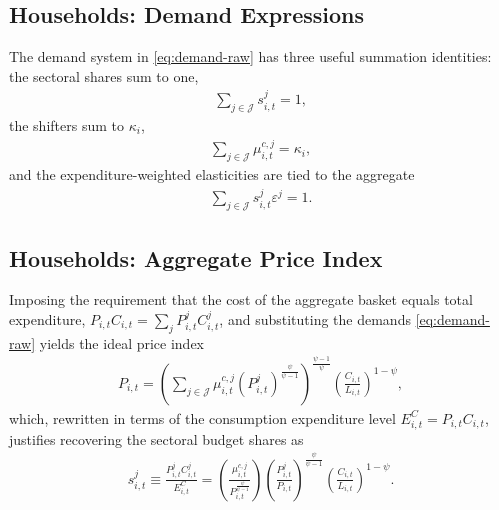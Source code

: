 \documentclass[10pt]{article}
\begin{document}
\subsection*{Households: Demand Expressions}
The demand system in \eqref{eq:demand-raw} has three useful summation identities:
the sectoral shares sum to one,
\begin{align}
  \sum_{j \in \mathcal{J}} s^j_{i,t} = 1, \label{eq:sum1}
\end{align}
the shifters sum to $\kappa_i$,
\begin{align}
  \sum_{j \in \mathcal{J}} \mu^{c,j}_{i,t} = \kappa_i, \label{eq:sum2}
\end{align}
and the expenditure-weighted elasticities are tied to the aggregate
\begin{align}
  \sum_{j \in \mathcal{J}} s^j_{i,t} \varepsilon^j = 1. \label{eq:sum3}
\end{align}

\subsection*{Households: Aggregate Price Index}
Imposing the requirement that the cost of the aggregate basket equals total
expenditure, $P_{i,t} C_{i,t} = \sum_{j} P^j_{i,t} C^j_{i,t}$, and substituting the
demands \eqref{eq:demand-raw} yields the ideal price index
\begin{align}
  P_{i,t} = \left( \sum_{j \in \mathcal{J}} \mu^{c,j}_{i,t}
  \left( P^j_{i,t} \right)^{\frac{\psi}{\psi - 1}} \right)^{\frac{\psi - 1}{\psi}}
  \left( \frac{C_{i,t}}{L_{i,t}} \right)^{1 - \psi},
\end{align}
which, rewritten in terms of the consumption expenditure level $E^C_{i,t} = P_{i,t} C_{i,t}$,
justifies recovering the sectoral budget shares as
\begin{align}
  s^j_{i,t} \equiv \frac{P^j_{i,t} C^j_{i,t}}{E^C_{i,t}}
  = \left( \frac{\mu^{c,j}_{i,t}}{P_{i,t}^{\frac{\psi}{\psi - 1}}} \right)
  \left( \frac{P^j_{i,t}}{P_{i,t}} \right)^{\frac{\psi}{\psi - 1}}
  \left( \frac{C_{i,t}}{L_{i,t}} \right)^{1 - \psi}. \label{eq:cons-shares}
\end{align}

\end{document}
